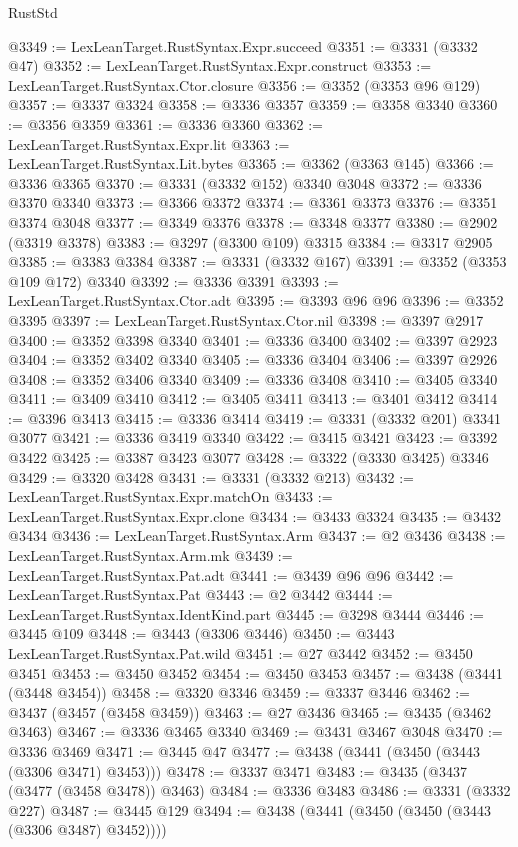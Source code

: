 \begin{lexlean}{RustStd}
\begin{coremodule}
@3349 := LexLeanTarget.RustSyntax.Expr.succeed
@3351 := @3331 (@3332 @47)
@3352 := LexLeanTarget.RustSyntax.Expr.construct
@3353 := LexLeanTarget.RustSyntax.Ctor.closure
@3356 := @3352 (@3353 @96 @129)
@3357 := @3337 @3324
@3358 := @3336 @3357
@3359 := @3358 @3340
@3360 := @3356 @3359
@3361 := @3336 @3360
@3362 := LexLeanTarget.RustSyntax.Expr.lit
@3363 := LexLeanTarget.RustSyntax.Lit.bytes
@3365 := @3362 (@3363 @145)
@3366 := @3336 @3365
@3370 := @3331 (@3332 @152) @3340 @3048
@3372 := @3336 @3370 @3340
@3373 := @3366 @3372
@3374 := @3361 @3373
@3376 := @3351 @3374 @3048
@3377 := @3349 @3376
@3378 := @3348 @3377
@3380 := @2902 (@3319 @3378)
@3383 := @3297 (@3300 @109) @3315
@3384 := @3317 @2905
@3385 := @3383 @3384
@3387 := @3331 (@3332 @167)
@3391 := @3352 (@3353 @109 @172) @3340
@3392 := @3336 @3391
@3393 := LexLeanTarget.RustSyntax.Ctor.adt
@3395 := @3393 @96 @96
@3396 := @3352 @3395
@3397 := LexLeanTarget.RustSyntax.Ctor.nil
@3398 := @3397 @2917
@3400 := @3352 @3398 @3340
@3401 := @3336 @3400
@3402 := @3397 @2923
@3404 := @3352 @3402 @3340
@3405 := @3336 @3404
@3406 := @3397 @2926
@3408 := @3352 @3406 @3340
@3409 := @3336 @3408
@3410 := @3405 @3340
@3411 := @3409 @3410
@3412 := @3405 @3411
@3413 := @3401 @3412
@3414 := @3396 @3413
@3415 := @3336 @3414
@3419 := @3331 (@3332 @201) @3341 @3077
@3421 := @3336 @3419 @3340
@3422 := @3415 @3421
@3423 := @3392 @3422
@3425 := @3387 @3423 @3077
@3428 := @3322 (@3330 @3425) @3346
@3429 := @3320 @3428
@3431 := @3331 (@3332 @213)
@3432 := LexLeanTarget.RustSyntax.Expr.matchOn
@3433 := LexLeanTarget.RustSyntax.Expr.clone
@3434 := @3433 @3324
@3435 := @3432 @3434
@3436 := LexLeanTarget.RustSyntax.Arm
@3437 := @2 @3436
@3438 := LexLeanTarget.RustSyntax.Arm.mk
@3439 := LexLeanTarget.RustSyntax.Pat.adt
@3441 := @3439 @96 @96
@3442 := LexLeanTarget.RustSyntax.Pat
@3443 := @2 @3442
@3444 := LexLeanTarget.RustSyntax.IdentKind.part
@3445 := @3298 @3444
@3446 := @3445 @109
@3448 := @3443 (@3306 @3446)
@3450 := @3443 LexLeanTarget.RustSyntax.Pat.wild
@3451 := @27 @3442
@3452 := @3450 @3451
@3453 := @3450 @3452
@3454 := @3450 @3453
@3457 := @3438 (@3441 (@3448 @3454))
@3458 := @3320 @3346
@3459 := @3337 @3446
@3462 := @3437 (@3457 (@3458 @3459))
@3463 := @27 @3436
@3465 := @3435 (@3462 @3463)
@3467 := @3336 @3465 @3340
@3469 := @3431 @3467 @3048
@3470 := @3336 @3469
@3471 := @3445 @47
@3477 := @3438 (@3441 (@3450 (@3443 (@3306 @3471) @3453)))
@3478 := @3337 @3471
@3483 := @3435 (@3437 (@3477 (@3458 @3478)) @3463)
@3484 := @3336 @3483
@3486 := @3331 (@3332 @227)
@3487 := @3445 @129
@3494 := @3438 (@3441 (@3450 (@3450 (@3443 (@3306 @3487) @3452))))

\end{coremodule}
\end{lexlean}

